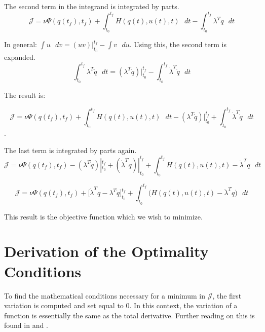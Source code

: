 The second term in the integrand is integrated by parts.\\

\begin{equation}
    \mathcal{  J  } = \nu \Psi ( q(t_f),t_f ) + \int_{t_0}^{t_f}  H(q(t),u(t),t) \text{  } dt - \int_{t_0}^{t_f} \lambda^T \ddot q \text{  } dt
\end{equation}

In general:  $\int u \text{  }dv =  (uv)|_{t_0}^{t_f} - \int v \text{  }du $. Using this, the second term is expanded.\\

\begin{equation}
    \int_{t_0}^{t_f} \lambda^T \ddot q \text{  } dt  =  (\lambda^T \dot q) |_{t_0}^{t_f} - \int_{t_0}^{t_f} \dot \lambda^T  \dot q\text{  } dt
\end{equation}

The result is:

\begin{equation}
    \mathcal{  J  } = \nu \Psi ( q(t_f),t_f ) + \int_{t_0}^{t_f}  H(q(t),u(t),t) \text{  } dt -(\lambda^T \dot q) |_{t_0}^{t_f} + \int_{t_0}^{t_f} \dot \lambda^T  \dot q\text{  } dt
\end{equation}.


The last term is integrated by parts again.\\

\begin{equation}
    \mathcal{  J  }= \nu \Psi ( q(t_f),t_f ) - (\lambda^T \dot q)|_{t_0}^{t_f} + (\dot \lambda^T  q)|_{t_0}^{t_f} + \int_{t_0}^{t_f}  H(q(t),u(t),t) - \ddot \lambda^T q \text{  }dt
\end{equation}

\begin{equation}
   \mathcal{  J  } = \nu \Psi ( q(t_f),t_f )  + \big[ \dot \lambda^T q - \lambda^T \dot q\big]_{t_0}^{t_f} + \int_{t_0}^{t_f}  \big( H(q(t),u(t),t) - \ddot \lambda^T q \big) \text{  } dt
\end{equation}




This result is the objective function which we wish to minimize.


\section{Derivation of the Optimality Conditions}


 To find the mathematical conditions necessary for a minimum in $\mathcal{  J  }$, the first variation is computed and set equal to 0. In this context, the variation of a function is essentially the same as the total derivative. Further reading on this is found in \cite{marion1995classical} and  \cite{cornelius1970variational}.


